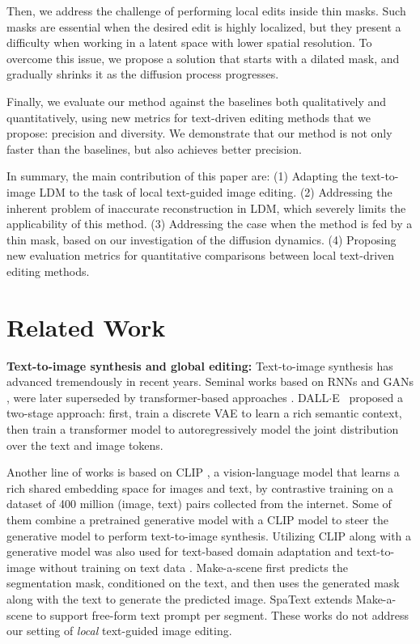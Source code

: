 Then, we address the challenge of performing local edits inside thin masks. Such masks are essential when the desired edit is highly localized, but they present a difficulty when working in a latent space with lower spatial resolution. To overcome this issue, we propose a solution that starts with a dilated mask, and gradually shrinks it as the diffusion process progresses. 

Finally, we evaluate our method against the baselines both qualitatively and quantitatively, using new metrics for text-driven editing methods that we propose: precision and diversity. We demonstrate that our method is not only faster than the baselines, but also achieves better precision.

In summary, the main contribution of this paper are: (1) Adapting the text-to-image LDM to the task of local text-guided image editing. (2) Addressing the inherent problem of inaccurate reconstruction in LDM, which severely limits the applicability of this method. (3) Addressing the case when the method is fed by a thin mask, based on our investigation of the diffusion dynamics. (4) Proposing new evaluation metrics for quantitative comparisons between local text-driven editing methods.

\section{Related Work}
\label{sec:related}

 \textbf{Text-to-image synthesis and global editing:} Text-to-image synthesis has advanced tremendously in recent years. Seminal works based on RNNs \cite{Mansimov2016GeneratingIF} and GANs \cite{reed2016generative, zhang2017stackgan, zhang2018stackgan++, xu2018attngan}, were later superseded by transformer-based  approaches \cite{vaswani2017attention}. {DALL$\cdot$E}~\cite{ramesh2021zero} proposed a two-stage approach: first, train a discrete VAE \cite{Oord2017NeuralDR, razavi2019generating} to learn a rich semantic context, then train a transformer model to autoregressively model the joint distribution over the text and image tokens.

Another line of works is based on CLIP \cite{radford2021learning}, a vision-language model that learns a rich shared embedding space for images and text, by contrastive training on a dataset of 400 million (image, text) pairs collected from the internet. Some of them \cite{patashnik2021styleclip,crowson2022vqgan,clip_guided_diffusion, liu2021more, big_sleep, paiss2022no} combine a pretrained generative model \cite{brock2018large, esser2021taming, dhariwal2021diffusion} with a CLIP model to steer the generative model to perform text-to-image synthesis. Utilizing CLIP along with a generative model was also used for text-based domain adaptation \cite{gal2021stylegan} and text-to-image without training on text data \cite{zhou2021lafite, wang2022clip, ashual2022knn}. Make-a-scene \cite{gafni2022make} first predicts the segmentation mask, conditioned on the text, and then uses the generated mask along with the text to generate the predicted image. SpaText \cite{avrahami2022spatext} extends Make-a-scene to support free-form text prompt per segment. These works do not address our setting of \emph{local} text-guided image editing.

